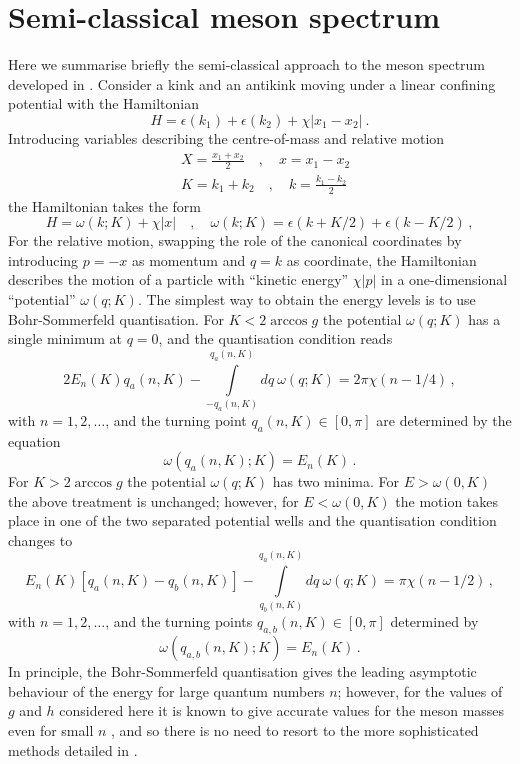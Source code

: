\documentclass[amsmath,amssymb,11pt]{article}
\numberwithin{equation}{section}
\numberwithin{figure}{section}
\numberwithin{table}{section}
\begin{document}
\section{Semi-classical meson spectrum}\label{app:semi-classical}
{Here we summarise briefly the semi-classical approach to the meson spectrum developed in \cite{2008JSP...131..917R}. Consider a kink and an antikink moving under a linear confining potential with the Hamiltonian
\begin{equation}
    H=\epsilon\left(k_1\right)+\epsilon\left(k_2\right)+\chi\left|x_1-x_2\right|\ .
\end{equation}
Introducing variables describing the centre-of-mass and relative motion
\begin{align}
    &X=\frac{x_1+x_2}{2}\quad , \quad x=x_1-x_2\nonumber\\
    &K=k_1+k_2\quad , \quad k=\frac{k_1-k_2}{2}\, 
\end{align}
the Hamiltonian takes the form
\begin{equation}
    H=\omega(k; K)+\chi|x|\quad , \quad \omega(k; K)=\epsilon(k+K/2)+\epsilon(k-K/2)\,,
\end{equation}
For the relative motion, swapping the role of the canonical coordinates by introducing $p=-x$ as momentum and $q=k$ as coordinate, the Hamiltonian describes the motion of a particle with ``kinetic energy'' $\chi|p|$ in a one-dimensional ``potential'' $\omega(q; K)$. The simplest way to obtain the energy levels is to use Bohr-Sommerfeld quantisation. For $K<2\arccos g$ the potential $\omega(q;K)$ has a single minimum at $q=0$, and the quantisation condition reads
\begin{equation}
    2 E_n(K)q_a(n,K)-\int\limits_{-q_a(n,K)}^{q_a(n,K)} dq\: \omega(q;K)=2\pi\chi(n-1/4)\,,
\end{equation}
with $n=1,2,\dots$, and the turning point $q_{a}(n,K)\in [0,\pi]$ are determined by the equation
\begin{equation}
    \omega\left(q_{a}(n,K);K\right)=E_n(K)\,.
\end{equation}
For $K>2 \arccos g$ the potential $\omega(q;K)$ has two minima. For $E>\omega(0,K)$ the above treatment is unchanged; however, for $E<\omega(0,K)$ the motion takes place in one of the two separated potential wells and the quantisation condition changes to
\begin{equation}
    E_n(K)\left[q_a(n,K)-q_b(n,K)\right]-\int\limits^{q_a(n,K)}_{q_b(n,K)} dq\: \omega(q;K)=\pi\chi(n-1/2)\,,
\end{equation}
with $n=1,2,\dots$, and the turning points $q_{a,b}(n,K)\in [0,\pi]$  determined by
\begin{equation}
    \omega\left(q_{a,b}(n,K);K\right)=E_n(K)\,.
\end{equation}
In principle, the Bohr-Sommerfeld quantisation gives the leading asymptotic behaviour of the energy for large quantum numbers $n$; however, for the values of $g$ and $h$ considered here it is known to give accurate values for the meson masses even for small $n$ \cite{2017NatPh..13..246K}, and so there is no need to resort to the more sophisticated methods detailed in \cite{2008JSP...131..917R}.}
\end{document}
